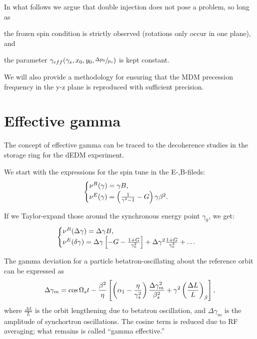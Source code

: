 \documentclass{article}
\begin{document}
In what follows we argue that double injection does not pose a problem, so long as 
\begin{inparaenum}[a)]
\item the frozen spin condition is strictly observed (rotations only occur in one plane), and
\item the parameter $\gamma_{eff}(\gamma_s, x_0, y_0, \sfrac{\Delta p_0}{p_s})$ is kept constant.
\end{inparaenum}
We will also provide a methodology for ensuring that the MDM precession frequency in the y-z plane is reproduced with sufficient precision.

\section{Effective gamma}
The concept of effective gamma can be traced to the decoherence studies in the storage ring for the dEDM experiment.~\cite{Senichev:StorageRingMethod}

We start with the expressions for the spin tune in the E-,B-fileds:
\begin{equation}\label{eq:spin_tune}
  \begin{cases}
    \nu^B(\gamma) = \gamma B,\\
    \nu^E(\gamma) = \bkt{\frac{1}{\gamma^2-1}-G}\gamma\beta^2.
  \end{cases}
\end{equation}

If we Taylor-expand those around the synchronous energy point $\gamma_0$, we get:
\begin{equation}
  \begin{cases}
    \nu^B(\Delta\gamma) = \Delta\gamma B,\\
    \nu^E(\delta\gamma) = \Delta\gamma\bkt*{-G - \frac{1+G}{\gamma_0^2}} + \Delta\gamma^2\frac{1+G}{\gamma_0^3} + \dots
  \end{cases}
\end{equation}

The gamma deviation for a particle betatron-oscillating about the reference orbit can be expressed as
\begin{equation}\label{eq:delta_gamma}
  \Delta\gamma_m = \cos\Omega_s t - \frac{\beta^2}{\eta}\bkt*{\bkt{\alpha_1 - \frac{\eta}{\gamma_s^2}}\frac{\Delta\gamma_m^2}{\beta_s^2} + \gamma^2\bkt{\frac{\Delta L}{L}}_\beta},
\end{equation}
where $\frac{\Delta L}{L}$ is the orbit lengthening due to betatron oscillation, and $\Delta\gamma_m$ is the amplitude of synchortron oscillations. The cosine term is reduced due to RF averaging; what remains is called ``gamma effective.''
\end{document}
